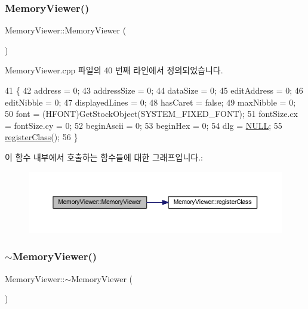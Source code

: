 \subsubsection{\texorpdfstring{Memory\+Viewer()}{MemoryViewer()}}
{\footnotesize\ttfamily Memory\+Viewer\+::\+Memory\+Viewer (\begin{DoxyParamCaption}{ }\end{DoxyParamCaption})}



Memory\+Viewer.\+cpp 파일의 40 번째 라인에서 정의되었습니다.


\begin{DoxyCode}
41 \{
42   address = 0;
43   addressSize = 0;
44   dataSize = 0;
45   editAddress = 0;
46   editNibble = 0;
47   displayedLines = 0;
48   hasCaret = \textcolor{keyword}{false};
49   maxNibble = 0;
50   font = (HFONT)GetStockObject(SYSTEM\_FIXED\_FONT);
51   fontSize.cx = fontSize.cy = 0;
52   beginAscii = 0;
53   beginHex = 0;
54   dlg = \mbox{\hyperlink{getopt1_8c_a070d2ce7b6bb7e5c05602aa8c308d0c4}{NULL}};
55   \mbox{\hyperlink{class_memory_viewer_af3d30272c691967ea6a4cc37ceb87595}{registerClass}}();
56 \}
\end{DoxyCode}
이 함수 내부에서 호출하는 함수들에 대한 그래프입니다.\+:
\nopagebreak
\begin{figure}[H]
\begin{center}
\leavevmode
\includegraphics[width=350pt]{class_memory_viewer_abb2fe8dcb2bfbf02b714dacc3d46cc55_cgraph}
\end{center}
\end{figure}
\mbox{\label{class_memory_viewer_a83792c0b253ba9095fa16a6ea05e4ccf}} 
\subsubsection{\texorpdfstring{$\sim$\+Memory\+Viewer()}{~MemoryViewer()}}
{\footnotesize\ttfamily Memory\+Viewer\+::$\sim$\+Memory\+Viewer (\begin{DoxyParamCaption}{ }\end{DoxyParamCaption})\hspace{0.3cm}{\ttfamily [virtual]}}



